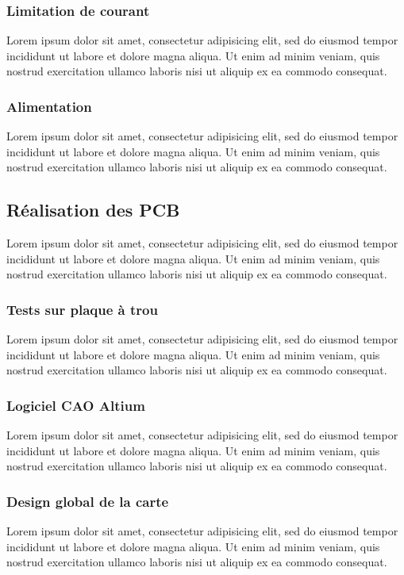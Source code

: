 \documentclass[a4paper,12pt]{report}
\begin{document}
			\subsubsection{Limitation de courant}
			Lorem ipsum dolor sit amet, consectetur adipisicing elit, sed do eiusmod tempor incididunt ut labore et dolore magna aliqua. Ut enim ad minim veniam, quis nostrud exercitation ullamco laboris nisi ut aliquip ex ea commodo consequat.
			
			\subsubsection{Alimentation}
			Lorem ipsum dolor sit amet, consectetur adipisicing elit, sed do eiusmod tempor incididunt ut labore et dolore magna aliqua. Ut enim ad minim veniam, quis nostrud exercitation ullamco laboris nisi ut aliquip ex ea commodo consequat.
			
			
		\subsection{Réalisation des  PCB}
		Lorem ipsum dolor sit amet, consectetur adipisicing elit, sed do eiusmod tempor incididunt ut labore et dolore magna aliqua. Ut enim ad minim veniam, quis nostrud exercitation ullamco laboris nisi ut aliquip ex ea commodo consequat.
		
			\subsubsection{Tests sur plaque à trou}
			Lorem ipsum dolor sit amet, consectetur adipisicing elit, sed do eiusmod tempor incididunt ut labore et dolore magna aliqua. Ut enim ad minim veniam, quis nostrud exercitation ullamco laboris nisi ut aliquip ex ea commodo consequat.
			
			\subsubsection{Logiciel CAO Altium}
			Lorem ipsum dolor sit amet, consectetur adipisicing elit, sed do eiusmod tempor incididunt ut labore et dolore magna aliqua. Ut enim ad minim veniam, quis nostrud exercitation ullamco laboris nisi ut aliquip ex ea commodo consequat.
			
			\subsubsection{Design global de la carte}
			Lorem ipsum dolor sit amet, consectetur adipisicing elit, sed do eiusmod tempor incididunt ut labore et dolore magna aliqua. Ut enim ad minim veniam, quis nostrud exercitation ullamco laboris nisi ut aliquip ex ea commodo consequat.
		
\end{document}
